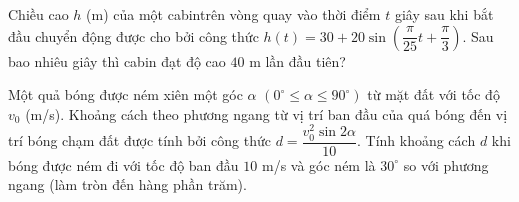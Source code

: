 \begin{ex}%
	Chiều cao $h$ (m) của một cabintrên vòng quay vào thời điểm  $t$ giây sau khi bắt đầu chuyển động được cho bởi công thức $h(t)=30 + 20\sin \left(\dfrac{\pi}{25}t + \dfrac{\pi}{3}\right)$. Sau bao nhiêu giây thì cabin đạt độ cao $40$ m lần đầu tiên?
\end{ex}

\begin{ex}%
	Một quả bóng được ném xiên một góc $\alpha$ $(0^\circ \le \alpha \le 90^\circ)$ từ mặt đất với tốc độ $v_0$ (m/s). Khoảng cách theo phương ngang từ vị  trí ban đầu của quá bóng đến vị trí bóng chạm đất được tính bởi công thức $d = \dfrac{v_0^2 \sin 2\alpha}{10}$. Tính khoảng cách $d$ khi bóng được ném đi với tốc độ ban đầu $10$ m/s và góc ném là $30^\circ$ so với phương ngang (làm tròn đến hàng phần trăm).
\end{ex}


